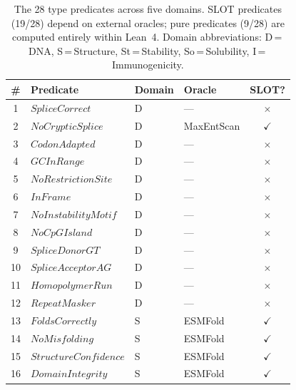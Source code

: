 \documentclass[acmsmall,review,anonymous]{acmart}
\begin{document}
\begin{table}[t]
\centering
\caption{The 28 type predicates across five domains. SLOT predicates
         (19/28) depend on external oracles; pure predicates (9/28)
         are computed entirely within Lean~4.
         Domain abbreviations: D\,=\,DNA, S\,=\,Structure,
         St\,=\,Stability, So\,=\,Solubility, I\,=\,Immunogenicity.}
\label{tab:predicates28}
\begin{tabular}{clllc}
\toprule
\textbf{\#} & \textbf{Predicate} & \textbf{Domain} &
  \textbf{Oracle} & \textbf{SLOT?} \\
\midrule
 1 & $\mathit{SpliceCorrect}$          & D  & ---                   & $\times$ \\
 2 & $\mathit{NoCrypticSplice}$        & D  & MaxEntScan            & $\checkmark$ \\
 3 & $\mathit{CodonAdapted}$           & D  & ---                   & $\times$ \\
 4 & $\mathit{GCInRange}$              & D  & ---                   & $\times$ \\
 5 & $\mathit{NoRestrictionSite}$      & D  & ---                   & $\times$ \\
 6 & $\mathit{InFrame}$                & D  & ---                   & $\times$ \\
 7 & $\mathit{NoInstabilityMotif}$     & D  & ---                   & $\times$ \\
 8 & $\mathit{NoCpGIsland}$            & D  & ---                   & $\times$ \\
 9 & $\mathit{SpliceDonorGT}$          & D  & ---                   & $\times$ \\
10 & $\mathit{SpliceAcceptorAG}$       & D  & ---                   & $\times$ \\
11 & $\mathit{HomopolymerRun}$         & D  & ---                   & $\times$ \\
12 & $\mathit{RepeatMasker}$           & D  & ---                   & $\times$ \\
\midrule
13 & $\mathit{FoldsCorrectly}$         & S  & ESMFold               & $\checkmark$ \\
14 & $\mathit{NoMisfolding}$           & S  & ESMFold               & $\checkmark$ \\
15 & $\mathit{StructureConfidence}$    & S  & ESMFold               & $\checkmark$ \\
16 & $\mathit{DomainIntegrity}$        & S  & ESMFold               & $\checkmark$ \\
\midrule

\end{tabular}
\end{table}
\end{document}
